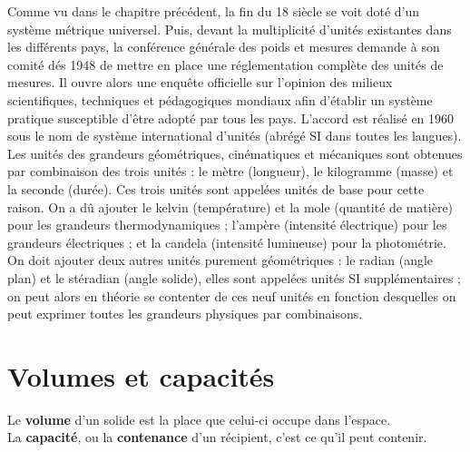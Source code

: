 \begin{prerequis}
Comme vu dans le chapitre précédent, la fin du 18 siècle se voit doté d'un système métrique universel. Puis, devant la multiplicité d’unités existantes dans les différents pays, la conférence générale des poids et mesures demande à son comité dés 1948 de mettre en place une réglementation complète des unités de mesures. Il ouvre alors une enquête officielle sur l’opinion des milieux scientifiques, techniques et pédagogiques mondiaux afin d’établir un système pratique susceptible d’être adopté par tous les pays. L’accord est réalisé en 1960 sous le nom de système international d’unités (abrégé SI dans toutes les langues). \\
Les unités des grandeurs géométriques, cinématiques et mécaniques sont obtenues par combinaison des trois unités : le mètre (longueur), le kilogramme (masse) et la seconde (durée). Ces trois unités sont appelées unités de base pour cette raison. On a dû ajouter le kelvin (température) et la mole (quantité de matière) pour les grandeurs thermodynamiques ; l'ampère (intensité électrique) pour les grandeurs électriques ; et la candela (intensité lumineuse) pour la photométrie. On doit ajouter deux autres unités purement géométriques : le radian (angle plan) et le stéradian (angle solide), elles sont appelées unités SI supplémentaires ; on peut alors en théorie se contenter de ces neuf unités en fonction desquelles on peut exprimer toutes les grandeurs physiques par combinaisons.
   \end{prerequis}

\cours

\section{Volumes et capacités} %

\begin{definition}
   Le \textbf{volume} d’un solide est la place que celui-ci occupe dans l’espace. \\
   La {\bf capacité}, ou la {\bf contenance} d’un récipient, c’est ce qu’il peut contenir.
\end{definition}

\medskip

